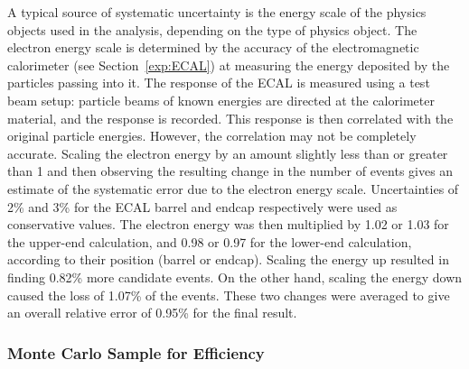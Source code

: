 
A typical source of systematic uncertainty 
is the energy scale of the physics objects 
used in the analysis, 
depending on the type of physics object.  
The electron energy scale is determined 
by the accuracy of the electromagnetic 
calorimeter (see Section~\ref{exp:ECAL})
at measuring the energy 
deposited by the particles passing into it.  
The response of the ECAL is measured 
using a test beam setup: 
particle beams of known energies are 
directed at the calorimeter material, 
and the response is recorded.  
This response is then correlated with the 
original particle energies.  
However, the correlation may not be completely 
accurate.  
Scaling the electron energy by an amount 
slightly less than or greater than 1 
and then observing the resulting change 
in the number of \Zee events 
gives an estimate of the systematic error 
due to the electron energy scale.  
Uncertainties of 2\% and 3\% %
for the ECAL barrel and endcap respectively 
were used as conservative values.  
The electron energy was then multiplied 
by 1.02 or 1.03 for the upper-end calculation, 
and 0.98 or 0.97 for the lower-end calculation, 
according to their position (barrel or endcap).  
Scaling the energy up resulted in finding 
0.82\% more \Zee candidate events.  
On the other hand, scaling the energy down 
caused the loss of 1.07\% of the events.  
These two changes were averaged 
to give an overall relative error 
of 0.95\% for the final result.  

\subsubsection{Monte Carlo Sample for Efficiency}
\label{anMeth:SystsOtherMCEff}


